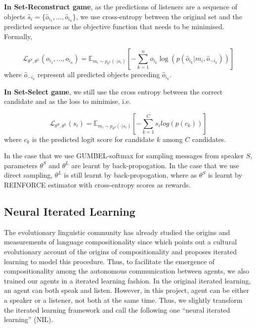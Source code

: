 \textbf{In Set-Reconstruct game}, as the predictions of listeners are a sequence of objects $\hat{s}_i=\{\hat{o}_{i_1}, \dots, \hat{o}_{i_n}\}$, we use cross-entropy between the original set and the predicted sequence as the objective function that needs to be minimised. Formally,

\begin{equation}
  \mathcal{L}_{\theta^S, \theta^L}(o_{i_1}, \dots, o_{i_n}) =\mathbb{E}_{m_i\sim p_{\theta^S}(\cdot|s_i)} \left[ -\sum_{k=1}^{n} o_{i_k} \log(p(\hat{o}_{i_k}|m_i, \hat{o}_{-i_k})) \right]
  \label{eq3.2.3.1:cross_entropy_seq}
\end{equation}
where $\hat{o}_{-i_k}$ represent all predicted objects preceding $\hat{o}_{i_k}$.

\noindent\textbf{In Set-Select game}, we still use the cross entropy between the correct candidate and  as the loss to minimise, i.e.

\begin{equation}
  \mathcal{L}_{\theta^S, \theta^L}(s_i) = \mathbb{E}_{m_i\sim p_{\theta^S}(\cdot|s_i)} \left[-\sum_{k=1}^{C} s_i log(p(c_k)) \right]
  \label{eq3.2.3.2:cross_entropy_choose}
\end{equation}
where $c_k$ is the predicted logit score for candidate $k$ among $C$ candidates.

In the case that we use GUMBEL-softmax for sampling messages from speaker $S$, parameters $\theta^S$ and $\theta^L$ are learnt by back-propogation. In the case that we use direct sampling, $\theta^L$ is still learnt by back-propogation, where as $\theta^S$ is learnt by REINFORCE estimator \cite{williams1992simple} with cross-entropy scores as rewards.

\subsection{Neural Iterated Learning}
\label{ssec3.2.4:iterated_learning}

The evolutionary linguistic community has already studied the origins and measurements of language compositionality since \cite{kirby2002emergence} which points out a cultural evolutionary account of the origins of compositionality and proposes iterated learning to model this procedure. Thus, to facilitate the emergence of compositionality among the autonomous communication between agents, we also trained our agents in a iterated learning fashion. In the original iterated learning, an agent can both speak and listen. However, in this project, agent can be either a speaker or a listener, not both at the same time. Thus, we slightly transform the iterated learning framework and call the following one ``neural iterated learning'' (NIL).

